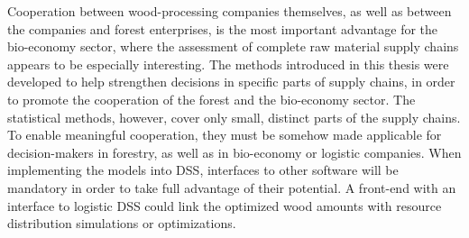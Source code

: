 Cooperation between wood-processing companies themselves, as well as between the companies and forest enterprises, is the most important advantage for the bio-economy sector, where the assessment of complete raw material supply chains appears to be especially interesting. The methods introduced in this thesis were developed to help strengthen decisions in specific parts of supply chains, in order to promote the cooperation of the forest and the bio-economy sector. The statistical methods, however, cover only small, distinct parts of the supply chains. To enable meaningful cooperation, they must be somehow made applicable for decision-makers in forestry, as well as in bio-economy or logistic companies. When implementing the models into DSS, interfaces to other software will be mandatory in order to take full advantage of their potential. A front-end with an interface to logistic DSS could link the optimized wood amounts with resource distribution simulations or optimizations.